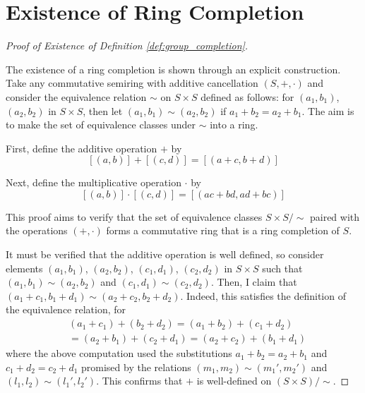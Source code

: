 \documentclass[../../sean_thesis.tex]{subfiles}
\begin{document}
\section{Existence of Ring Completion}
\label{sec:ring_comp_ex}
\begin{proof}[Proof of Existence of Definition \ref{def:group_completion}]~


The existence of a ring completion is shown through an explicit construction. Take any commutative semiring with additive cancellation $(S,+,\cdot)$ and consider the equivalence relation $\sim$ on $S \times S$ defined as follows: for $(a_1, b_1)$, $(a_2, b_2)$ in $S \times S$, then let $(a_1,b_1) \sim (a_2,b_2)$ if $a_1 + b_2 = a_2 + b_1$. The aim is to make the set of equivalence classes under $\sim$ into a ring.


First, define the additive operation $+$ by 
	$$[(a,b)] + [(c,d)] = [(a+c,b+d)]$$	
	

Next, define the multiplicative operation $\cdot$ by
	$$[(a,b)]\cdot[(c,d)] = [(ac+bd, ad+bc)]$$


This proof aims to verify that the set of equivalence classes $S \times S/\sim$ paired with the operations $(+, \cdot)$ forms a commutative ring that is a ring completion of $S$.
	
	
It must be verified that the additive operation is well defined, so consider elements $(a_1, b_1)$, $(a_2, b_2)$, $(c_1, d_1)$, $(c_2, d_2)$ in $S \times S$ such that $(a_1, b_1) \sim (a_2, b_2)$ and $(c_1, d_1) \sim (c_2, d_2)$. Then, I claim that $(a_1+c_1,b_1+d_1) \sim (a_2+c_2,b_2+d_2)$. Indeed, this satisfies the definition of the equivalence relation, for
	\begin{align*}
		& (a_1 + c_1) + (b_2 + d_2) = (a_1 + b_2) + (c_1 + d_2) \\
		& = (a_2 + b_1) + (c_2 + d_1) = (a_2 + c_2) + (b_1 + d_1)
	\end{align*}
where the above computation used the substitutions $a_1+b_2 = a_2+b_1$ and $c_1+d_2 = c_2+d_1$ promised by the relations $(m_1, m_2) \sim (m_1', m_2')$ and $(l_1, l_2) \sim (l_1', l_2')$. This confirms that $+$ is well-defined on $(S\times S)/\sim$.
	


\end{proof}
\end{document}
